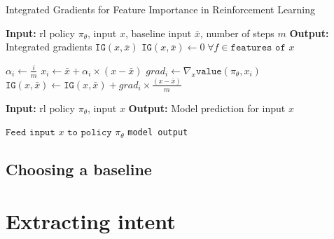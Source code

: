 \documentclass[UKenglish]{uiomasterthesis}
\begin{document}
\begin{algorithm}
\caption{Integrated Gradients for Feature Importance in Reinforcement Learning}
\label{alg:intgrad}
\begin{algorithmic}
    \State \textbf{Input:} \ac{rl} policy $\pi_\theta$, input $x$, baseline input $\bar{x}$, number of steps $m$
    \State \textbf{Output:} Integrated gradients $\texttt{IG}(x, \bar{x})$
    \State $\texttt{IG}(x, \bar{x}) \gets 0 \; \forall f \in \texttt{features of } x$ 
    
        \State $\alpha_i \gets \frac{i}{m}$
        \State $x_i \gets \bar{x} + \alpha_i \times (x - \bar{x})$
        \State $grad_i \gets \nabla_x \texttt{value}(\pi_\theta, x_i)$ 
        \State $\texttt{IG}(x, \bar{x}) \gets \texttt{IG}(x, \bar{x}) + grad_i \times \frac{(x - \bar{x})}{m}$
    \EndFor
    
        \State \textbf{Input:} \ac{rl} policy $\pi_\theta$, input $x$
        \State \textbf{Output:} Model prediction for input $x$
        
        \State $\texttt{Feed input } x \texttt{ to policy } \pi_\theta$
        \State \Return \texttt{model output}
    \EndFunction
\end{algorithmic}
\end{algorithm}


\subsection{Choosing a baseline}

\section{Extracting intent}
\end{document}
